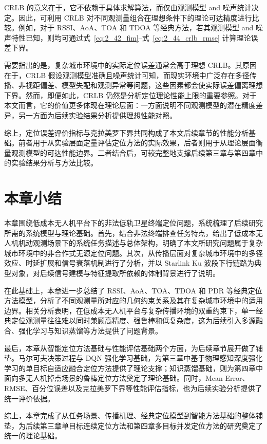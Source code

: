 CRLB 的意义在于，它不依赖于具体求解算法，而仅由观测模型 and 噪声统计决定。因此，可利用 CRLB 对不同观测量组合在理想条件下的理论可达精度进行比较。例如，对于 RSSI、AoA、TOA 和 TDOA 等经典方法，若其观测模型 and 噪声特性已知，则均可通过式~\eqref{eq:2_42_fim}--式~\eqref{eq:2_44_crlb_rmse} 计算理论误差下界。

需要指出的是，复杂城市环境中的实际定位误差通常会高于理想 CRLB。其原因在于，CRLB 假设观测模型准确且噪声统计可知，而现实环境中广泛存在多径传播、非视距偏差、模型失配和观测异常等问题，这些因素都会使实际误差偏离理想下界。然而，即便如此，CRLB 仍然是分析定位理论性能上限的重要参照。对于本文而言，它的价值更多体现在理论层面：一方面说明不同观测模型的潜在精度差异，另一方面为后续实验结果分析提供理想性能对照。

综上，定位误差评价指标与克拉美罗下界共同构成了本文后续章节的性能分析基础。前者用于从实验层面定量评估定位方法的实际效果，后者则用于从理论层面衡量观测模型的可达性能边界。二者结合后，可较完整地支撑后续第三章与第四章中的实验结果分析与方法比较。

\section{本章小结}
\label{sec:2_6}

本章围绕低成本无人机平台下的非法低轨卫星终端定位问题，系统梳理了后续研究所需的系统模型与理论基础。首先，结合非法终端排查任务特点，给出了低成本无人机机动观测场景下的系统任务描述与总体架构，明确了本文所研究问题属于复杂城市环境中的非合作式无源定位问题。其次，从传播层面对复杂城市环境中的多径效应、时延扩展和信号衰落机制进行了分析，并以 Starlink Ku 波段下行链路为典型对象，对后续信号建模与特征提取所依赖的体制背景进行了说明。

在此基础上，本章进一步总结了 RSSI、AoA、TOA、TDOA 和 PDR 等经典定位方法模型，分析了不同观测量所对应的几何约束关系及其在复杂城市环境中的适用边界。相关分析表明，在低成本无人机平台与复杂传播环境的双重约束下，单一经典定位观测量往往难以同时兼顾高精度、强鲁棒和低复杂度，这为后续引入多源融合、强化学习与知识蒸馏等方法提供了问题背景。

最后，本章从智能定位方法基础与性能评估基础两个方面，为后续章节展开做了铺垫。马尔可夫决策过程与 DQN 强化学习基础，为第三章中基于物理感知深度强化学习的单目标自适应融合定位方法提供了理论支撑；知识蒸馏基础，则为第四章中面向多无人机掉点场景的鲁棒定位方法奠定了理论基础。同时，Mean Error、RMSE、百分位误差以及克拉美罗下界等性能评估指标，也为后续实验分析提供了统一评价依据。

综上，本章完成了从任务场景、传播机理、经典定位模型到智能方法基础的整体铺垫，为后续第三章单目标连续定位方法和第四章多目标并发定位方法的研究奠定了统一的理论基础。
